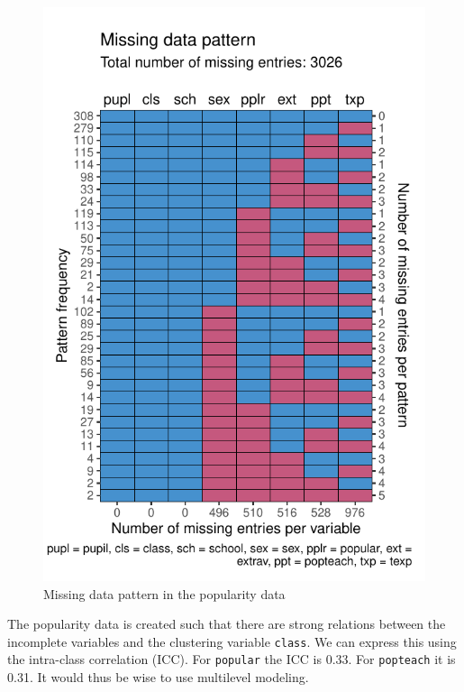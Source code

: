 \documentclass[
]{jss}
\begin{document}
\begin{CodeChunk}
\begin{figure}

{\centering \includegraphics{Manuscript_files/figure-latex/pop_pat-1} 

}

\caption[Missing data pattern in the popularity data]{Missing data pattern in the popularity data}\label{fig:pop_pat}
\end{figure}
\end{CodeChunk}

The popularity data is created such that there are strong relations
between the incomplete variables and the clustering variable
\texttt{class}. We can express this using the intra-class correlation
(ICC). For \texttt{popular} the ICC is 0.33. For \texttt{popteach} it is
0.31. It would thus be wise to use multilevel modeling.
\end{document}
